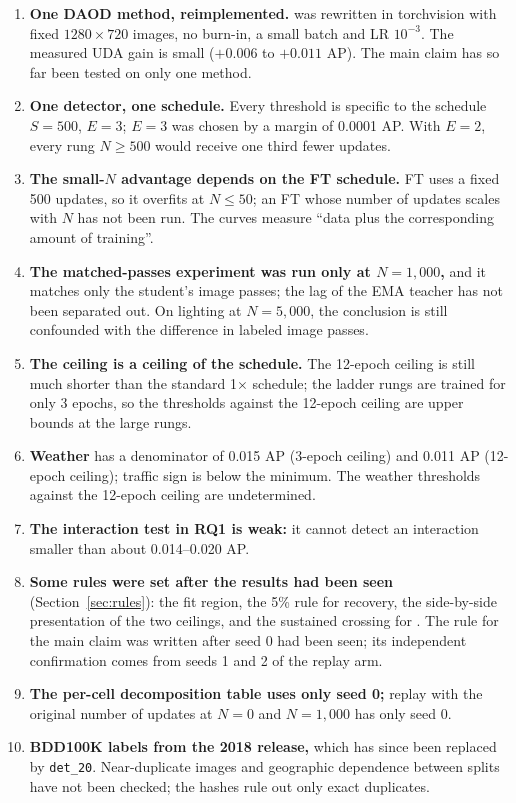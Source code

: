 \begin{enumerate}
\item \textbf{One DAOD method, reimplemented.} \aldi was rewritten in torchvision with fixed $1280\times720$ images, no burn-in, a small batch and LR $10^{-3}$. The measured UDA gain is small ($+0.006$ to $+0.011$ AP). The main claim has so far been tested on only one method.
\item \textbf{One detector, one schedule.} Every threshold is specific to the schedule $S = 500$, $E = 3$; $E = 3$ was chosen by a margin of 0.0001 AP. With $E = 2$, every rung $N \geq 500$ would receive one third fewer updates.
\item \textbf{The small-$N$ advantage depends on the FT schedule.} FT uses a fixed 500 updates, so it overfits at $N \leq 50$; an FT whose number of updates scales with $N$ has not been run. The curves measure ``data plus the corresponding amount of training''.
\item \textbf{The matched-passes experiment was run only at $N = 1{,}000$,} and it matches only the student's image passes; the lag of the EMA teacher has not been separated out. On lighting at $N = 5{,}000$, the conclusion is still confounded with the difference in labeled image passes.
\item \textbf{The ceiling is a ceiling of the schedule.} The 12-epoch ceiling is still much shorter than the standard 1$\times$ schedule; the ladder rungs are trained for only 3 epochs, so the thresholds against the 12-epoch ceiling are upper bounds at the large rungs.
\item \textbf{Weather} has a denominator of 0.015 AP (3-epoch ceiling) and 0.011 AP (12-epoch ceiling); traffic sign is below the minimum. The weather thresholds against the 12-epoch ceiling are undetermined.
\item \textbf{The interaction test in RQ1 is weak:} it cannot detect an interaction smaller than about 0.014--0.020 AP.
\item \textbf{Some rules were set after the results had been seen} (Section~\ref{sec:rules}): the fit region, the 5\% rule for recovery, the side-by-side presentation of the two ceilings, and the sustained crossing for \Neq. The rule for the main claim was written after seed 0 had been seen; its independent confirmation comes from seeds 1 and 2 of the replay arm.
\item \textbf{The per-cell decomposition table uses only seed 0;} replay with the original number of updates at $N = 0$ and $N = 1{,}000$ has only seed 0.
\item \textbf{BDD100K labels from the 2018 release,} which has since been replaced by \texttt{det\_20}. Near-duplicate images and geographic dependence between splits have not been checked; the hashes rule out only exact duplicates.
\end{enumerate}

